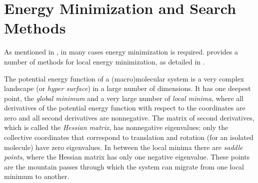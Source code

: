 \section{Energy Minimization and Search Methods}

As mentioned in , in many cases energy minimization
is required. {\gromacs} provides a number of methods for local energy
minimization, as detailed in .

The potential energy function of a (macro)molecular system is a very
complex landscape (or {\em hyper surface}) in a large number of
dimensions. It has one deepest point, the {\em global minimum} and a
very large number of {\em local minima}, where all derivatives of the
potential energy function with respect to the coordinates are zero and
all second derivatives are nonnegative. The matrix of second
derivatives, which is called the {\em Hessian matrix}, has nonnegative
eigenvalues; only the collective coordinates that correspond to
translation and rotation (for an isolated molecule) have zero
eigenvalues. In between the local minima there are {\em saddle
points}, where the Hessian matrix has only one negative
eigenvalue. These points are the mountain passes through which the
system can migrate from one local minimum to another.

